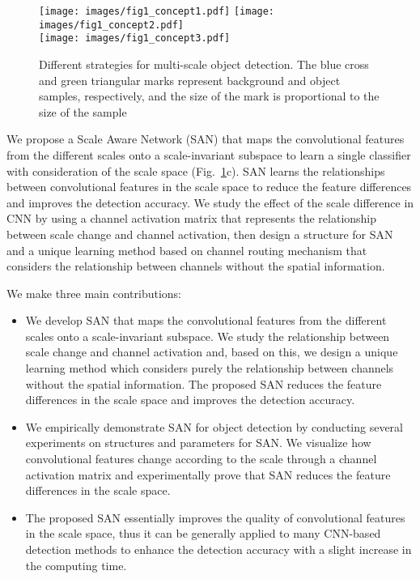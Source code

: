 \documentclass[runningheads]{llncs}
\begin{document}
\begin{figure}[t]
	\texttt{[image: images/fig1\_concept1.pdf]}
	\texttt{[image: images/fig1\_concept2.pdf]}\\
	\texttt{[image: images/fig1\_concept3.pdf]}
	\caption{Different strategies for multi-scale object detection. The blue cross and green triangular marks represent background and object samples, respectively, and the size of the mark is proportional to the size of the sample}
	\centering
	\label{fig:SAN_CONCEPTS}
\end{figure}


We propose a Scale Aware Network (SAN) that maps the convolutional features from the different scales onto a scale-invariant subspace to learn a single classifier with consideration of the scale space (Fig.~\ref{fig:SAN_CONCEPTS}c).
SAN learns the relationships between convolutional features in the scale space to reduce the feature differences and improves the detection accuracy.
We study the effect of the scale difference in CNN by using a channel activation matrix that represents the relationship between scale change and channel activation,
then design a structure for SAN and a unique learning method based on channel routing mechanism that considers the relationship between channels without the spatial information.

We make three main contributions: 
\begin{itemize}[leftmargin=+.4in,label=$\bullet$]
	\item We develop SAN that maps the convolutional features from the different scales onto a scale-invariant subspace.
	We study the relationship between scale change and channel activation and, based on this,
	we design a unique learning method which considers purely the relationship between channels without the spatial information.
	The proposed SAN reduces the feature differences in the scale space and improves the detection accuracy.
	
	\item We empirically demonstrate SAN for object detection by conducting several experiments on structures and parameters for SAN.
	We visualize how convolutional features change according to the scale through a channel activation matrix and 
	experimentally prove that SAN reduces the feature differences in the scale space.
	
	
	\item The proposed SAN essentially improves the quality of convolutional features in the scale space,
	thus it can be generally applied to many CNN-based detection methods to enhance the detection accuracy with a slight increase in the computing time. 
\end{itemize}
\end{document}
